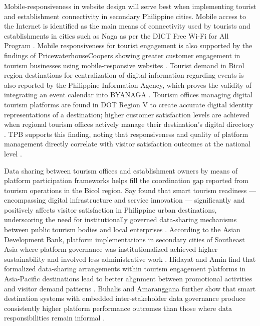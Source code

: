 \documentclass{research}
\begin{document}
Mobile-responsiveness in website design will serve best when implementing tourist and establishment connectivity in secondary Philippine cities. Mobile access to the Internet is identified as the main means of connectivity used by tourists and establishments in cities such as Naga as per the DICT Free Wi-Fi for All Program \cite{dictwifi}. Mobile responsiveness for tourist engagement is also supported by the findings of PricewaterhouseCoopers showing greater customer engagement in tourism businesses using mobile-responsive websites \cite{pwc2021}. Tourist demand in Bicol region destinations for centralization of digital information regarding events is also reported by the Philippine Information Agency, which proves the validity of integrating an event calendar into BYANAGA \cite{pia2023}. Tourism offices managing digital tourism platforms are found in DOT Region V to create accurate digital identity representations of a destination; higher customer satisfaction levels are achieved when regional tourism offices actively manage their destination's digital directory \cite{dotregionv2024}. TPB supports this finding, noting that responsiveness and quality of platform management directly correlate with visitor satisfaction outcomes at the national level \cite{tpb2023}.

Data sharing between tourism offices and establishment owners by means of platform participation frameworks helps fill the coordination gap reported from tourism operations in the Bicol region. Say found that smart tourism readiness — encompassing digital infrastructure and service innovation — significantly and positively affects visitor satisfaction in Philippine urban destinations, underscoring the need for institutionally governed data-sharing mechanisms between public tourism bodies and local enterprises \cite{say2025}. According to the Asian Development Bank, platform implementations in secondary cities of Southeast Asia where platform governance was institutionalized achieved higher sustainability and involved less administrative work \cite{adb2025}. Hidayat and Amin find that formalized data-sharing arrangements within tourism engagement platforms in Asia-Pacific destinations lead to better alignment between promotional activities and visitor demand patterns \cite{hidayat2023a}. Buhalis and Amaranggana further show that smart destination systems with embedded inter-stakeholder data governance produce consistently higher platform performance outcomes than those where data responsibilities remain informal \cite{buhalis2023}.
\end{document}
